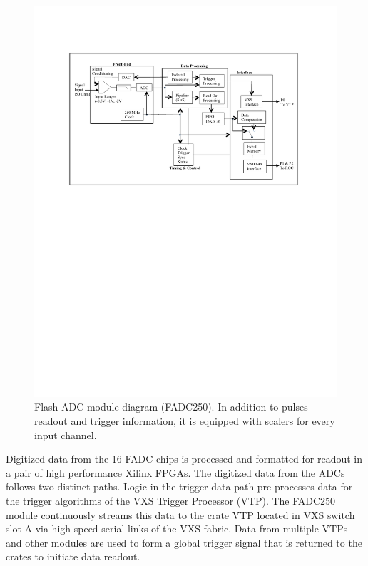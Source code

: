 \begin{figure}[hbt]
	\centering
	\includegraphics[width=1.0\columnwidth,keepaspectratio]{img/FADC250_Diagram.pdf}
	\caption{Flash ADC module diagram (FADC250). In addition to pulses readout and trigger information, it is equipped
          with scalers for every input channel.}
	\label{fig:FADC250_board}
\end{figure}

Digitized data from the 16 FADC chips is processed and formatted for readout in a pair of high performance Xilinx
FPGAs. The digitized data from the ADCs follows two distinct paths.  Logic in the trigger data path pre-processes data
for the trigger algorithms of the VXS Trigger Processor (VTP). The FADC250 module continuously streams this data to
the crate VTP located in VXS switch slot A via high-speed serial links of the VXS fabric.  Data from multiple VTPs and
other modules are used to form a global trigger signal that is returned to the crates to initiate data readout.

